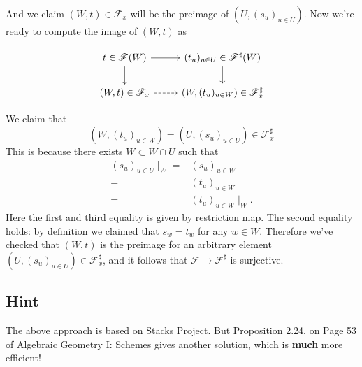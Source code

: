And we claim $(W,t)\in \mathscr F_x$ will be the preimage of $(U,(s_u)_{u\in U})$. Now we're ready to compute the image of $(W,t)$ as 


\[\begin{tikzcd}
	{t\in\mathscr F(W)} & {(t_u)_{u\in U}\in \mathscr F^{\sharp}(W)} \\
	{(W,t)\in\mathscr F_x} & {(W,(t_u)_{u\in W})\in \mathscr F^{\sharp}_x}
	\arrow[from=1-1, to=1-2]
	\arrow[from=1-1, to=2-1]
	\arrow[from=1-2, to=2-2]
	\arrow[dashed, from=2-1, to=2-2]
\end{tikzcd}\]

We claim that \[(W,(t_u)_{u\in W})=(U,(s_u)_{u\in U})\in \mathscr F^{\sharp}_x\]
This is because there exists $W\subset W\cap U$ such that \begin{align*}
    (s_u)_{u\in U}\mid_W =& (s_u)_{u\in W}\\
    =& (t_u)_{u\in W}\\
    =& (t_u)_{u\in W}\mid_W.
\end{align*}Here the first and third equality is given by restriction map. The second equality holds: by definition we claimed that $s_w=t_w$ for any $w\in W$. Therefore we've checked that $(W,t)$ is the preimage for an arbitrary element $(U,(s_u)_{u\in U})\in \mathscr F^{\sharp}_x$, and it follows that $\mathscr F\to\mathscr F^{\sharp}$ is surjective.

\subsection{Hint}

The above approach is based on Stacks Project. But Proposition 2.24. on Page 53 of Algebraic Geometry I: Schemes \cite{gortz2020algebraic} gives another solution, which is \textbf{much} more efficient!

